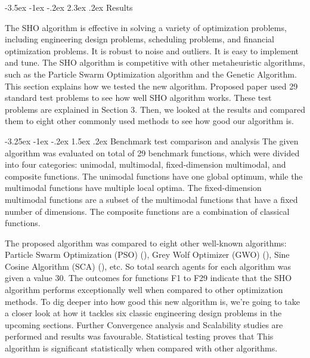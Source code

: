 \documentclass[12pt]{article}
\makeatletter
\renewcommand\section{\@startsection {section}{1}{1em}%
                                   {-3.5ex \@plus -1ex \@minus -.2ex}%
                                   {2.3ex \@plus.2ex}%
                                   {\normalfont\fontsize{14}{16}\bfseries}}
\renewcommand\subsection{\@startsection {subsection}{2}{1em}%
                                   {-3.25ex \@plus -1ex \@minus -.2ex}%
                                   {1.5ex \@plus .2ex}%
                                   {\normalfont\fontsize{12}{14}\bfseries}}
\makeatother
\begin{document}
\section{Results}

The SHO algorithm is effective in solving a variety of optimization problems, including engineering design problems, scheduling problems, and financial optimization problems. It is robust to noise and outliers. It is easy to implement and tune. 
The SHO algorithm is competitive with other metaheuristic algorithms, such as the Particle Swarm Optimization algorithm and the Genetic Algorithm.
This section explains how we tested the new algorithm. Proposed paper used 29 standard test problems to see how well SHO algorithm works. These test problems are explained in Section 3. Then, we looked at the results and compared them to eight other commonly used methods to see how good our algorithm is.

\subsection{Benchmark test comparison and analysis}
The given algorithm was evaluated on total of 29 benchmark functions, which were divided into four categories: unimodal, multimodal, fixed-dimension multimodal, and composite functions. The unimodal functions have one global optimum, while the multimodal functions have multiple local optima. The fixed-dimension multimodal functions are a subset of the multimodal functions that have a fixed number of dimensions. The composite functions are a combination of classical functions.



The proposed algorithm was compared to eight other well-known algorithms: Particle Swarm Optimization (PSO) (\cite{kennedy1995particle}), Grey Wolf Optimizer (GWO) (\cite{mirjalili2014grey}), Sine Cosine Algorithm (SCA) (\cite{mirjalili2016sca}), etc. So total search agents for each algorithm was given a value 30.
The outcomes for functions F1 to F29 indicate that the SHO algorithm performs exceptionally well when compared to other optimization methods. To dig deeper into how good this new algorithm is, we're going to take a closer look at how it tackles six classic engineering design problems in the upcoming sections.
Further Convergence analysis and Scalability studies are performed and results was favourable. Statistical testing proves that This algorithm is significant statistically when compared with other algorithms.
\end{document}
